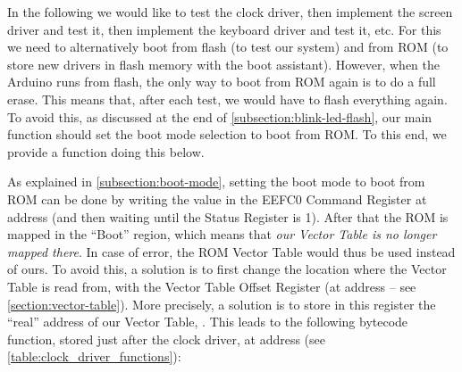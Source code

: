 In the following we would like to test the clock driver, then implement the
screen driver and test it, then implement the keyboard driver and test it, etc.
For this we need to alternatively boot from flash (to test our system) and from
ROM (to store new drivers in flash memory with the boot assistant). However,
when the Arduino runs from flash, the only way to boot from ROM again is to do
a full erase. This means that, after each test, we would have to flash
everything again. To avoid this, as discussed at the end of
\cref{subsection:blink-led-flash}, our main function should set the boot mode
selection to boot from ROM. To this end, we provide a function doing this below.


%
As explained in \cref{subsection:boot-mode}, setting the boot mode to boot from
ROM can be done by writing the value  in the EEFC0 Command
Register at address  (and then waiting until the
Status Register is 1). After that the ROM is mapped in the ``Boot'' region,
which means that {\em our Vector Table is no longer mapped there}. In case of
error, the ROM Vector Table would thus be used instead of ours. To avoid this,
a solution is to first change the location where the Vector Table is read from,
with the Vector Table Offset Register (at address  -- see
\cref{section:vector-table}). More precisely, a solution is to store in this
register the ``real'' address of our Vector Table, . This leads to
the following bytecode function, stored just after the clock driver, at address
 (see \cref{table:clock_driver_functions}):

\begin{TwoColumns}
\end{TwoColumns}


